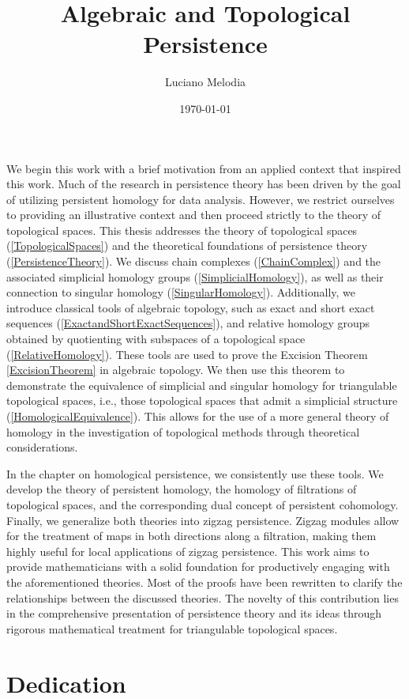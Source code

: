 \documentclass[b5paper, 12pt, twoside]{report}
\title{Algebraic and Topological Persistence}
\author{Luciano Melodia}
\date{\today}
\begin{document}
	
	
	We begin this work with a brief motivation from an applied context that inspired
	this work. Much of the research in persistence theory has been driven by the
	goal of utilizing persistent homology for data analysis. However, we restrict
	ourselves to providing an illustrative context and then proceed strictly to
	the theory of topological spaces. This thesis addresses the theory of topological
	spaces (\ref{TopologicalSpaces}) and the theoretical foundations of persistence
	theory (\ref{PersistenceTheory}). We discuss chain complexes (\ref{ChainComplex})
	and the associated simplicial homology groups (\ref{SimplicialHomology}), as well
	as their connection to singular homology (\ref{SingularHomology}).
	Additionally, we introduce classical tools of algebraic topology, such as
	exact and short exact sequences (\ref{ExactandShortExactSequences}), and relative
	homology groups obtained by quotienting with subspaces of a topological space (\ref{RelativeHomology}).
	These tools are used to prove the Excision Theorem \ref{ExcisionTheorem} in
	algebraic topology. We then use this theorem to demonstrate the equivalence of
	simplicial and singular homology for triangulable topological spaces, i.e.,
	those topological spaces that admit a simplicial structure (\ref{HomologicalEquivalence}).
	This allows for the use of a more general theory of homology in the investigation
	of topological methods through theoretical considerations.

	In the chapter on homological persistence, we consistently use these tools. We
	develop the theory of persistent homology, the homology of filtrations of
	topological spaces, and the corresponding dual concept of persistent cohomology.
	Finally, we generalize both theories into zigzag persistence. Zigzag modules
	allow for the treatment of maps in both directions along a filtration, making them
	highly useful for local applications of zigzag persistence. This work aims to
	provide mathematicians with a solid foundation for productively engaging with
	the aforementioned theories. Most of the proofs have been rewritten to clarify
	the relationships between the discussed theories. The novelty of this
	contribution lies in the comprehensive presentation of persistence theory and
	its ideas through rigorous mathematical treatment for triangulable topological
	spaces.
	\chapter*{Dedication}
\end{document}
